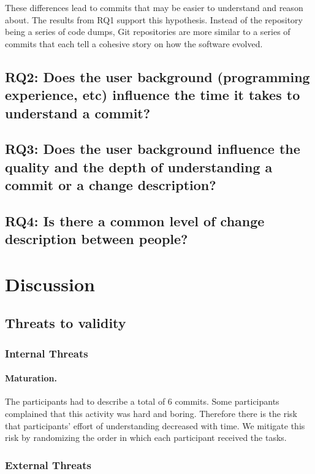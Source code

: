 \documentclass[letterpaper]{article}
\begin{document}
These differences lead to commits that may be easier to understand and reason about.
The results from RQ1 support this hypothesis.
Instead of the repository being a series of code dumps, Git repositories are more similar to a series of commits that each tell a cohesive story on how the software evolved.




\subsection{RQ2: Does the user background (programming experience, etc) influence the time it takes to understand a commit?}

\subsection{RQ3: Does the user background influence the quality and the depth of understanding a commit or a change description?}

\subsection{RQ4: Is there a common level of change description between people?}

\section{Discussion}

\subsection{Threats to validity}

\subsubsection{Internal Threats}

\paragraph{Maturation.}
The participants had to describe a total of 6 commits.
Some participants complained that this activity was hard and boring.
Therefore there is the risk that participants' effort of understanding decreased with time.
We mitigate this risk by randomizing the order in which each participant received the tasks.

\subsubsection{External Threats}
\end{document}
